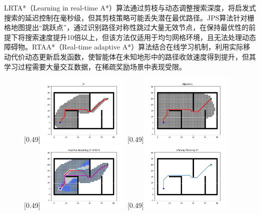 \documentclass[master,academic]{ysuthesis} %
\begin{document}
		LRTA*（Learning in real-time A*）算法通过剪枝与动态调整搜索深度，将启发式搜索的延迟控制在毫秒级，但其剪枝策略可能丢失潜在最优路径。JPS算法针对栅格地图提出“跳跃点”，通过识别路径对称性跳过大量无效节点，在保持最优性的前提下将搜索速度提升10倍以上，但该方法仅适用于均匀网格环境，且无法处理动态障碍物。RTAA*（Real-time adaptive A*）算法结合在线学习机制，利用实际移动代价动态更新启发函数，使智能体在未知地形中的路径收敛速度得到提升，但其学习过程需要大量交互数据，在稀疏奖励场景中表现受限。
		\begin{figure}[H]
			\centering
			[0.49\textwidth]{\includegraphics[width=0.4\textwidth]{fig/插图/A-search/Astar.png}}
			[0.49\textwidth]{\includegraphics[width=0.4\textwidth]{fig/插图/A-search/Dijstra.png}}
			[0.49\textwidth]{\includegraphics[width=0.4\textwidth]{fig/插图/A-search/ARAstar.png}}
			[0.49\textwidth]{\includegraphics[width=0.4\textwidth]{fig/插图/A-search/LPAstar.png}}

\end{figure}
\end{document}
